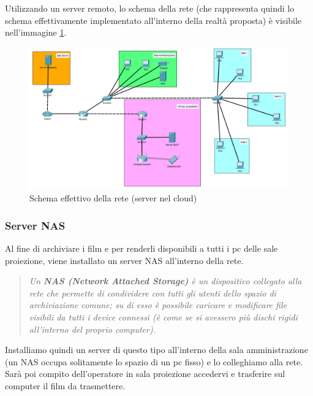 \documentclass{article}
\begin{document}
\begin{itemize}
    Utilizzando un server remoto, lo schema della rete (che rappresenta quindi lo schema effettivamente implementato all'interno della realtà proposta) è visibile nell'immagine \ref{fig:SchemaDatabaseEsterno}.
    
    \begin{figure}[H]
    \centering
    \includegraphics[width=\textwidth]{SchemaReteDatabaseEsterno.png}
    \caption{Schema effettivo della rete (server nel cloud)}
    \label{fig:SchemaDatabaseEsterno}
    \end{figure}
    \end{itemize}

\subsubsection{Server NAS}\label{sec:NAS}
Al fine di archiviare i film e per renderli disponibili a tutti i pc delle sale proiezione, viene installato un server NAS all'interno della rete.

\begin{quote}
    \begin{Cit}
    \textit{
    Un \textbf{NAS (Network Attached Storage)} è un dispositivo collegato alla rete che permette di condividere con tutti gli utenti dello spazio di archiviazione comune; su di esso è possibile caricare e modificare file visibili da tutti i device connessi (è  come se si avessero più dischi rigidi all'interno del proprio computer).}
    \end{Cit}
    \end{quote}

Installiamo quindi un server di questo tipo all'interno della sala amministrazione (un NAS occupa solitamente lo spazio di un pc fisso) e lo colleghiamo alla rete. Sarà poi compito dell'operatore in sala proiezione accedervi e trasferire sul computer il film da trasmettere.
\end{document}
